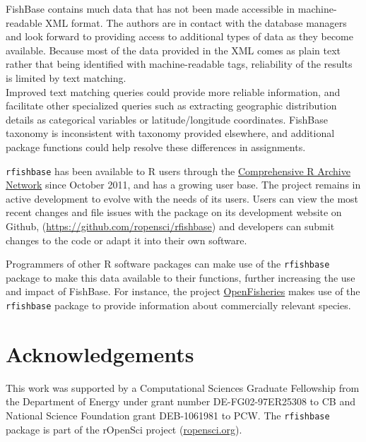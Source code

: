 FishBase contains much data that has not been made accessible in
machine-readable XML format. The authors are in contact with the
database managers and look forward to providing access to additional
types of data as they become available. Because most of the data
provided in the XML comes as plain text rather that being identified
with machine-readable tags, reliability of the results is limited by
text matching.\\Improved text matching queries could provide more
reliable information, and facilitate other specialized queries such as
extracting geographic distribution details as categorical variables or
latitude/longitude coordinates. FishBase taxonomy is inconsistent with
taxonomy provided elsewhere, and additional package functions could help
resolve these differences in assignments.

\texttt{rfishbase} has been available to R users through the
\href{http://cran.r-project.org/web/packages/rfishbase/}{Comprehensive R
Archive Network} since October 2011, and has a growing user base. The
project remains in active development to evolve with the needs of its
users. Users can view the most recent changes and file issues with the
package on its development website on Github,
(\href{https://github.com/ropensci/rfishbase}{https://github.com/ropensci/rfishbase})
and developers can submit changes to the code or adapt it into their own
software.

Programmers of other R software packages can make use of the
\texttt{rfishbase} package to make this data available to their
functions, further increasing the use and impact of FishBase. For
instance, the project \href{http://OpenFisheries.org}{OpenFisheries}
makes use of the \texttt{rfishbase} package to provide information about
commercially relevant species.

\section{Acknowledgements}

This work was supported by a Computational Sciences Graduate Fellowship
from the Department of Energy under grant number DE-FG02-97ER25308 to CB
and National Science Foundation grant DEB-1061981 to PCW. The
\texttt{rfishbase} package is part of the rOpenSci project
(\href{http://ropensci.org}{ropensci.org}).




